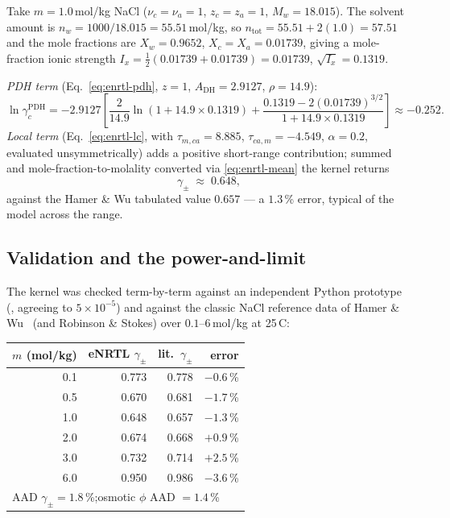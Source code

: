 \documentclass[11pt,a4paper]{article}
\begin{document}
\begin{example}
Take $m = 1.0$\,mol/kg NaCl ($\nu_c=\nu_a=1$, $z_c=z_a=1$, $M_w=18.015$).
The solvent amount is $n_w = 1000/18.015 = 55.51$\,mol/kg, so
$n_{\text{tot}} = 55.51 + 2(1.0) = 57.51$ and the mole fractions are
$X_w = 0.9652$, $X_c = X_a = 0.01739$, giving a mole-fraction ionic
strength $I_x = \tfrac12(0.01739 + 0.01739) = 0.01739$, $\sqrt{I_x} =
0.1319$.

\emph{PDH term} (Eq.~\ref{eq:enrtl-pdh}, $z=1$, $A_{\mathrm{DH}}=2.9127$,
$\rho=14.9$):
\[
   \ln\gamma_c^{\mathrm{PDH}}
   = -2.9127\!\left[\frac{2}{14.9}\ln(1+14.9\times0.1319)
   + \frac{0.1319 - 2(0.01739)^{3/2}}{1+14.9\times0.1319}\right]
   \approx -0.252.
\]
\emph{Local term} (Eq.~\ref{eq:enrtl-lc}, with $\tau_{m,ca}=8.885$,
$\tau_{ca,m}=-4.549$, $\alpha=0.2$, evaluated unsymmetrically) adds a
positive short-range contribution; summed and mole-fraction-to-molality
converted via \eqref{eq:enrtl-mean} the kernel returns
\[
   \gamma_\pm \;\approx\; 0.648,
\]
against the Hamer \& Wu tabulated value $0.657$ --- a $1.3$\,\% error,
typical of the model across the range.
\end{example}

\subsection{Validation and the power-and-limit}

The kernel was checked term-by-term against an independent Python
prototype (, agreeing to
$5\times10^{-5}$) and against the classic NaCl reference data of
Hamer \& Wu~\cite{HamerWu1972} (and Robinson \& Stokes) over
$0.1$--$6$\,mol/kg at 25\,\textdegree C:

\begin{center}
\begin{tabular}{r r r r}
\hline
$m$ (mol/kg) & eNRTL $\gamma_\pm$ & lit.\ $\gamma_\pm$ & error \\
\hline
0.1 & 0.773 & 0.778 & $-0.6$\,\% \\
0.5 & 0.670 & 0.681 & $-1.7$\,\% \\
1.0 & 0.648 & 0.657 & $-1.3$\,\% \\
2.0 & 0.674 & 0.668 & $+0.9$\,\% \\
3.0 & 0.732 & 0.714 & $+2.5$\,\% \\
6.0 & 0.950 & 0.986 & $-3.6$\,\% \\
\hline
\multicolumn{4}{l}{AAD $\gamma_\pm = 1.8$\,\%;\quad osmotic $\phi$ AAD $= 1.4$\,\%}\\
\hline
\end{tabular}
\end{center}
\end{document}
